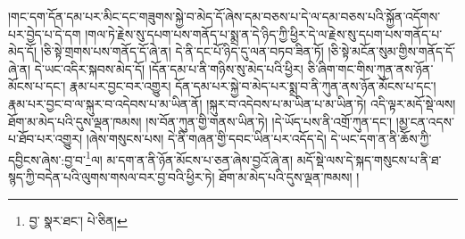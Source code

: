 །གང་དག་དོན་དམ་པར་མིང་དང་གཟུགས་སྐྱེ་བ་མེད་དོ་ཞེས་དམ་བཅས་པ་དེ་ལ་དམ་བཅས་པའི་སྐྱོན་འདོགས་པར་བྱེད་པ་དེ་དག །གལ་ཏེ་རྗེས་སུ་དཔག་པས་གནོད་པ་སྨྲ་ན་དེ་ཉིད་ཀྱི་ཕྱིར་དེ་ལ་རྗེས་སུ་དཔག་པས་གནོད་པ་མེད་དོ། །ཅི་སྟེ་གྲགས་པས་གནོད་དོ་ཞེ་ན། དེ་ནི་དང་པོ་ཉིད་དུ་ལན་བཏབ་ཟིན་ཏོ། །ཅི་སྟེ་མངོན་སུམ་གྱིས་གནོད་དོ་ཞེ་ན། དེ་ཡང་འདིར་སྐབས་མེད་དོ། །དོན་དམ་པ་ནི་གཉིས་སུ་མེད་པའི་ཕྱིར། ཅི་ཞིག་གང་གིས་ཀུན་ནས་ཉོན་མོངས་པ་དང་། རྣམ་པར་བྱང་བར་འགྱུར། དོན་དམ་པར་སྐྱེ་བ་མེད་པར་སྨྲ་བ་ནི་ཀུན་ནས་ཉོན་མོངས་པ་དང་། རྣམ་པར་བྱང་བ་ལ་སྐུར་བ་འདེབས་པ་མ་ཡིན་ནོ། །སྐུར་བ་འདེབས་པ་མ་ཡིན་པ་མ་ཡིན་ཏེ། འདི་ལྟར་མདོ་སྡེ་ལས། ཐོག་མ་མེད་པའི་དུས་ལྡན་ཁམས། །ས་བོན་ཀུན་གྱི་གནས་ཡིན་ཏེ། །དེ་ཡོད་པས་ནི་འགྲོ་ཀུན་དང་། །མྱ་ངན་འདས་པ་ཐོབ་པར་འགྱུར། །ཞེས་གསུངས་པས། དེ་ནི་གཞན་གྱི་དབང་ཡིན་པར་འདོད་དེ། དེ་ཡང་དག་ན་ནི་ཆོས་ཀྱི་དབྱིངས་ཞེས་:བྱ་བ་\footnote{བྱ་  སྣར་ཐང་།  པེ་ཅིན། }ལ། མ་དག་ན་ནི་ཉོན་མོངས་པ་ཅན་ཞེས་བྱའོ་ཞེ་ན། མདོ་སྡེ་ལས་དེ་སྐད་གསུངས་པ་ནི་ཐ་སྙད་ཀྱི་བདེན་པའི་ལུགས་གསལ་བར་བྱ་བའི་ཕྱིར་ཏེ། ཐོག་མ་མེད་པའི་དུས་ལྡན་ཁམས། །
